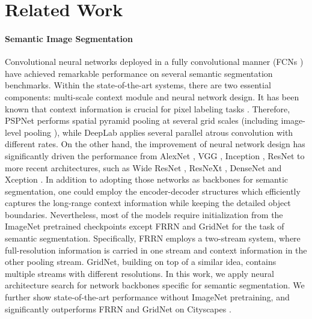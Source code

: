 \documentclass[10pt,twocolumn,letterpaper]{article}
\begin{document}
 \section{Related Work}
\label{sec:related_work}

\paragraph{Semantic Image Segmentation}

Convolutional neural networks \cite{lecun1989backpropagation} deployed in a fully convolutional manner (FCNs \cite{sermanet2013overfeat,long2014fully}) have achieved remarkable performance on several semantic segmentation benchmarks. Within the state-of-the-art systems, there are two essential components: multi-scale context module and neural network design. It has been known that context information is crucial for pixel labeling tasks \cite{he2004multiscale,shotton2009textonboost,kohli2009robust,ladicky2009associative,farabet2013learning,mostajabi2014feedforward,dai2015convolutional,chen2015attention}. Therefore, PSPNet \cite{zhao2017pyramid} performs spatial pyramid pooling \cite{grauman2005pyramid,lazebnik2006beyond,he2014spatial} at several grid scales (including image-level pooling \cite{liu2015parsenet}), while DeepLab \cite{chen2017deeplab,chen2017rethinking} applies several parallel atrous convolution \cite{holschneider1989real,giusti2013fast,sermanet2013overfeat,papandreou2014untangling,chen2014semantic} with different rates. On the other hand, the improvement of neural network design has significantly driven the performance from AlexNet \cite{krizhevsky2012imagenet}, VGG \cite{simonyan2014very}, Inception \cite{ioffe2015batch,szegedy2016rethinking,szegedy2017inception}, ResNet \cite{he2016deep} to more recent architectures, such as Wide ResNet \cite{Zagoruyko2016WRN}, ResNeXt \cite{xie2017aggreated}, DenseNet \cite{huang2017densely} and Xception \cite{chollet2016xception, dai2017coco}. In addition to adopting those networks as backbones for semantic segmentation, one could employ the encoder-decoder structures \cite{ronneberger2015u,badrinarayanan2015segnet,newell2016stacked,lin2016refinenet,pohlen2016full,peng2017large,islamgated,wojna2017devil,fu2017stacked,deeplabv3plus2018,zhang2018exfuse,xiao2018unified} which efficiently captures the long-range context information while keeping the detailed object boundaries. Nevertheless, most of the models require initialization from the ImageNet \cite{ILSVRC15} pretrained checkpoints except FRRN \cite{pohlen2016full} and GridNet \cite{fourure2017residual} for the task of semantic segmentation. Specifically, FRRN \cite{pohlen2016full} employs a two-stream system, where full-resolution information is carried in one stream and context information in the other pooling stream. GridNet, building on top of a  similar idea, contains multiple streams with different resolutions. In this work, we apply neural architecture search for network backbones specific for semantic segmentation. We further show state-of-the-art performance without ImageNet pretraining, and significantly outperforms FRRN \cite{pohlen2016full} and GridNet \cite{fourure2017residual} on Cityscapes \cite{Cordts2016Cityscapes}.
\end{document}
